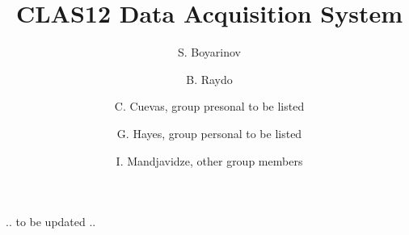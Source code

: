 \title{CLAS12 Data Acquisition System}

\author[A]{S. Boyarinov}
\author[A]{B. Raydo}
\author[A]{C. Cuevas, group presonal to be listed}
\author[A]{G. Hayes, group personal to be listed}
\author[B]{I. Mandjavidze, other group members}
.. to be updated ..

\address[A]{Thomas Jefferson National Accelerator Facility, Newport News, VA, USA}
\address[B]{Sacley, France}
\address[C]{INFN, Milan, Italy}
